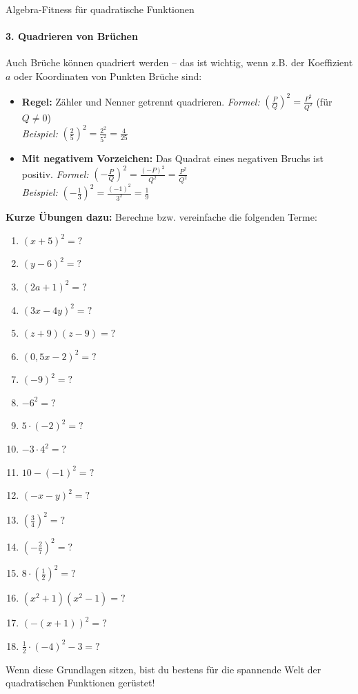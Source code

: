 \begin{erinnerungsboxumgebung}{Algebra-Fitness für quadratische Funktionen}
\paragraph{3. Quadrieren von Brüchen}
Auch Brüche können quadriert werden – das ist wichtig, wenn z.B. der Koeffizient $a$ oder Koordinaten von Punkten Brüche sind:
\begin{itemize}
    \item \textbf{Regel:} Zähler und Nenner getrennt quadrieren.
    \textit{Formel:} $\left(\frac{P}{Q}\right)^2 = \frac{P^2}{Q^2}$ (für $Q \neq 0$) \\
    \textit{Beispiel:} $\left(\frac{2}{5}\right)^2 = \frac{2^2}{5^2} = \frac{4}{25}$
    \item \textbf{Mit negativem Vorzeichen:} Das Quadrat eines negativen Bruchs ist positiv.
    \textit{Formel:} $\left(-\frac{P}{Q}\right)^2 = \frac{(-P)^2}{Q^2} = \frac{P^2}{Q^2}$ \\
    \textit{Beispiel:} $\left(-\frac{1}{3}\right)^2 = \frac{(-1)^2}{3^2} = \frac{1}{9}$
\end{itemize}

\vspace{0.5em} %
\textbf{Kurze Übungen dazu:}
Berechne bzw. vereinfache die folgenden Terme:
\begin{multicols}{3}
\begin{enumerate}[label=(\alph*)]
    \item $(x+5)^2 = ?$
    \item $(y-6)^2 = ?$
    \item $(2a+1)^2 = ?$
    \item $(3x-4y)^2 = ?$
    \item $(z+9)(z-9) = ?$
    \item $(0,5x-2)^2 = ?$
    \item $(-9)^2 = ?$
    \item $-6^2 = ?$
    \item $5 \cdot (-2)^2 = ?$
    \item $-3 \cdot 4^2 = ?$
    \item $10 - (-1)^2 = ?$
    \item $(-x-y)^2 = ?$
    \item $\left(\frac{3}{4}\right)^2 = ?$
    \item $\left(-\frac{2}{7}\right)^2 = ?$
    \item $8 \cdot \left(\frac{1}{2}\right)^2 = ?$
    \item $(x^2+1)(x^2-1) = ?$
    \item $(-(x+1))^2 = ?$
    \item $\frac{1}{2} \cdot (-4)^2 - 3 = ?$
\end{enumerate}
\end{multicols}

Wenn diese Grundlagen sitzen, bist du bestens für die spannende Welt der quadratischen Funktionen gerüstet!
\end{erinnerungsboxumgebung}



